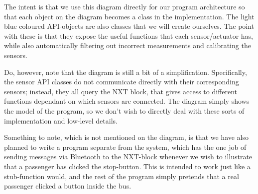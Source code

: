 The intent is that we use this diagram directly for our program architecture so that each object on the diagram becomes a class in the implementation. The light blue coloured API-objects are also classes that we will create ourselves. The point with these is that they expose the useful functions that each sensor/actuator has, while also automatically filtering out incorrect measurements and calibrating the sensors.

Do, however, note that the diagram is still a bit of a simplification. Specifically, the sensor API classes do not communicate directly with their corresponding sensors; instead, they all query the NXT block, that gives access to different functions dependant on which sensors are connected. The diagram simply shows the model of the program, so we don't wish to directly deal with these sorts of implementation and low-level details. 

Something to note, which is not mentioned on the diagram, is that we have also planned to write a program separate from the system, which has the one job of sending messages via Bluetooth to the NXT-block whenever we wish to illustrate that a passenger has clicked the stop-button. This is intended to work just like a stub-function would, and the rest of the program simply pretends that a real passenger clicked a button inside the bus.
